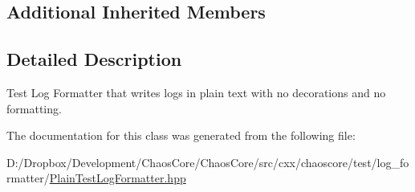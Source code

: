 \subsection*{Additional Inherited Members}


\subsection{Detailed Description}
Test Log Formatter that writes logs in plain text with no decorations and no formatting. 

The documentation for this class was generated from the following file\+:\begin{DoxyCompactItemize}
\item 
D\+:/\+Dropbox/\+Development/\+Chaos\+Core/\+Chaos\+Core/src/cxx/chaoscore/test/log\+\_\+formatter/\hyperlink{_plain_test_log_formatter_8hpp}{Plain\+Test\+Log\+Formatter.\+hpp}\end{DoxyCompactItemize}
